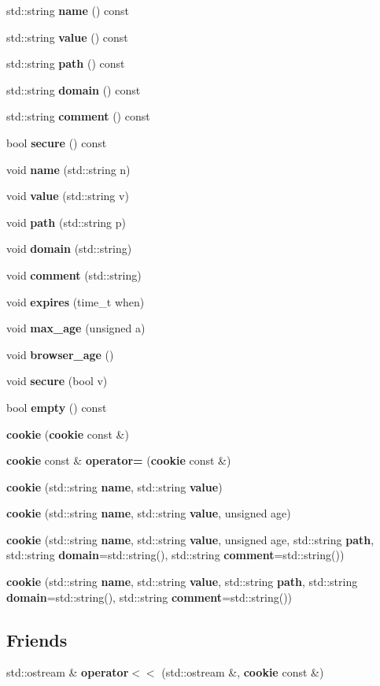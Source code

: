 \begin{DoxyCompactItemize}
\item 
std\-::string {\bf name} () const 
\item 
std\-::string {\bf value} () const 
\item 
std\-::string {\bf path} () const 
\item 
std\-::string {\bf domain} () const 
\item 
std\-::string {\bf comment} () const 
\item 
bool {\bf secure} () const 
\item 
void {\bf name} (std\-::string n)
\item 
void {\bf value} (std\-::string v)
\item 
void {\bf path} (std\-::string p)
\item 
void {\bf domain} (std\-::string)
\item 
void {\bf comment} (std\-::string)
\item 
void {\bf expires} (time\-\_\-t when)
\item 
void {\bf max\-\_\-age} (unsigned a)
\item 
void {\bf browser\-\_\-age} ()
\item 
void {\bf secure} (bool v)
\item 
bool {\bf empty} () const 
\item 
{\bfseries cookie} ({\bf cookie} const \&)\label{classcppcms_1_1http_1_1cookie_a499a6443b52d30660481f06242907739}

\item 
{\bf cookie} const \& {\bfseries operator=} ({\bf cookie} const \&)\label{classcppcms_1_1http_1_1cookie_a14d9c1764f457f432532e288d41265ce}

\item 
{\bf cookie} (std\-::string {\bf name}, std\-::string {\bf value})
\item 
{\bf cookie} (std\-::string {\bf name}, std\-::string {\bf value}, unsigned age)
\item 
{\bf cookie} (std\-::string {\bf name}, std\-::string {\bf value}, unsigned age, std\-::string {\bf path}, std\-::string {\bf domain}=std\-::string(), std\-::string {\bf comment}=std\-::string())
\item 
{\bf cookie} (std\-::string {\bf name}, std\-::string {\bf value}, std\-::string {\bf path}, std\-::string {\bf domain}=std\-::string(), std\-::string {\bf comment}=std\-::string())
\end{DoxyCompactItemize}
\subsection*{\-Friends}
\begin{DoxyCompactItemize}
\item 
std\-::ostream \& {\bfseries operator$<$$<$} (std\-::ostream \&, {\bf cookie} const \&)\label{classcppcms_1_1http_1_1cookie_a70dcba4b7aaf0804d26d88e235311b52}

\end{DoxyCompactItemize}


